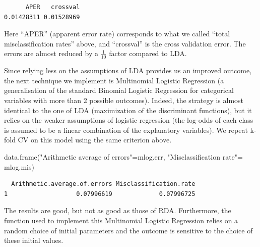\documentclass[
  letterpaper,
  DIV=11,
  numbers=noendperiod]{scrartcl}
\newenvironment{Shaded}{\begin{snugshade}}{\end{snugshade}}
\newcommand{\AttributeTok}[1]{\textcolor[rgb]{0.40,0.45,0.13}{#1}}
\newcommand{\ConstantTok}[1]{\textcolor[rgb]{0.56,0.35,0.01}{#1}}
\newcommand{\DecValTok}[1]{\textcolor[rgb]{0.68,0.00,0.00}{#1}}
\newcommand{\FunctionTok}[1]{\textcolor[rgb]{0.28,0.35,0.67}{#1}}
\newcommand{\NormalTok}[1]{\textcolor[rgb]{0.00,0.23,0.31}{#1}}
\newcommand{\OtherTok}[1]{\textcolor[rgb]{0.00,0.23,0.31}{#1}}
\newcommand{\SpecialCharTok}[1]{\textcolor[rgb]{0.37,0.37,0.37}{#1}}
\newcommand{\StringTok}[1]{\textcolor[rgb]{0.13,0.47,0.30}{#1}}
\begin{document}
\begin{Shaded}
\end{Shaded}

\begin{verbatim}
      APER   crossval 
0.01428311 0.01528969 
\end{verbatim}

Here ``APER'' (apparent error rate) corresponds to what we called
``total misclassification rates'' above, and ``crossval'' is the cross
validation error. The errors are almost reduced by a \(\frac{1}{10}\)
factor compared to LDA.

Since relying less on the assumptions of LDA provides us an improved
outcome, the next technique we implement is Multinomial Logistic
Regression (a generalisation of the standard Binomial Logistic
Regression for categorical variables with more than 2 possible
outcomes). Indeed, the strategy is almost identical to the one of LDA
(maximization of the discriminant functions), but it relies on the
weaker assumptions of logistic regression (the log-odds of each class is
assumed to be a linear combination of the explanatory variables). We
repeat k-fold CV on this model using the same criterion above.

\begin{Shaded}
\begin{Highlighting}[]
\FunctionTok{data.frame}\NormalTok{(}\StringTok{"Arithmetic average of errors"}\OtherTok{=}\NormalTok{mlog.err, }
           \StringTok{"Misclassification rate"}\OtherTok{=}\NormalTok{ mlog.mis)}
\end{Highlighting}
\end{Shaded}

\begin{verbatim}
  Arithmetic.average.of.errors Misclassification.rate
1                   0.07996619             0.07996725
\end{verbatim}

The results are good, but not as good as those of RDA. Furthermore, the
function used to implement this Multinomial Logistic Regression relies
on a random choice of initial parameters and the outcome is sensitive to
the choice of these initial values.
\end{document}
